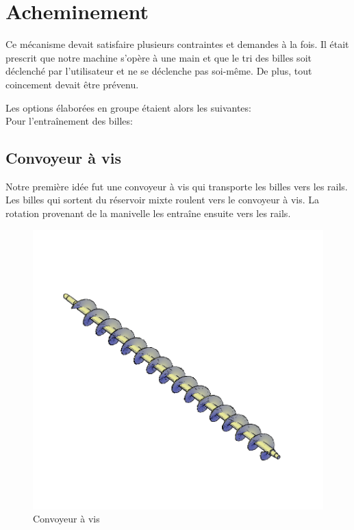 \section{Acheminement}
Ce mécanisme devait satisfaire plusieurs contraintes et demandes à la fois. Il était prescrit que notre machine s'opère à une main et que le tri des billes soit déclenché par l'utilisateur et ne se déclenche pas soi-même. De plus, tout coincement devait être prévenu.

Les options élaborées en groupe étaient alors les suivantes:\\
Pour l'entraînement des billes:

\subsection{Convoyeur à vis}
Notre première idée fut une convoyeur à vis qui transporte les billes vers les rails. Les billes qui sortent du réservoir mixte roulent vers le convoyeur à vis. La rotation provenant de la manivelle les entraîne ensuite vers les rails.

\begin{figure}
    \centering
    \includegraphics[width=\textwidth]{Graphics/Images_concepts_Leon/795-Screw_conveyor.png}
    \caption{Convoyeur à vis}
\end{figure}

